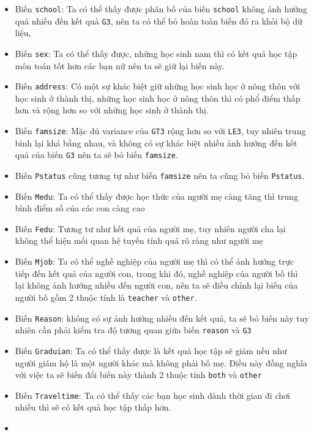     \begin{itemize}
\tightlist
\item
  Biến \texttt{school}: Ta có thể thấy được phân bố của biến
  \texttt{school} không ảnh hưởng quá nhiều đến kết quả \texttt{G3}, nên
  ta có thể bỏ hoàn toàn biến đó ra khỏi bộ dữ liệu,
\item
  Biến \texttt{sex}: Ta có thể thấy được, những học sinh nam thì có kết
  quả học tập môn toán tốt hơn các bạn nữ nên ta sẽ giữ lại biến này.
\item
  Biến \texttt{address}: Có một sự khác biệt giữ những học sinh học ở
  nông thôn với học sinh ở thành thị, những học sinh học ở nông thôn thì
  có phổ điểm thấp hơn và rộng hơn so với những học sinh ở thành thị.
\item
  Biến \texttt{famsize}: Mặc dú variance của \texttt{GT3} rộng hơn so
  với \texttt{LE3}, tuy nhiên trung bình lại khá bằng nhau, và không có
  sự khác biệt nhiều ảnh hưởng đến kết quả của biến \texttt{G3} nên ta
  sẽ bỏ biến \texttt{famsize}.
\item
  Biến \texttt{Pstatus} cũng tương tự như biến \texttt{famsize} nên ta
  cũng bỏ biến \texttt{Pstatus}.
\item
  Biến \texttt{Medu}: Ta có thể thấy được học thức của người mẹ càng tăng thì trung bình điểm số của các con càng cao
\item
  Biến \texttt{Fedu}: Tương tư như kết quả của người mẹ, tuy nhiên người cha lại không thể hiện mối quan hệ tuyến tính quá rõ ràng như người mẹ
\item
  Biến \texttt{Mjob}: Ta có thể nghề nghiệp của người mẹ thì có thể ảnh
  hưởng trực tiếp đến kết quả của người con, trong khi đó, nghề nghiệp
  của người bố thì lại không ảnh hưởng nhiều đến người con, nên ta sẽ
  điều chỉnh lại biến của người bố gồm 2 thuộc tính là \texttt{teacher}
  và \texttt{other}.
\item
  Biến \texttt{Reason}: không có sự ảnh hưởng nhiều đến kết quả, ta sẽ
  bỏ biến này tuy nhiên cần phải kiểm tra độ tương quan giữa biến
  \texttt{reason} và \texttt{G3}
\item
  Biến \texttt{Graduian}: Ta có thể thấy được là kết quả học tập sẽ giảm
  nếu như người giám hộ là một người khác mà không phải bố mẹ. Điều này
  đồng nghĩa với việc ta sẽ biến đổi biến này thành 2 thuộc tính
  \texttt{both} và \texttt{other}
\item
  Biến \texttt{Traveltime}: Ta có thể thấy các bạn học sinh dành thời
  gian đi chơi nhiều thì sẽ có kết quả học tập thấp hơn.
\item

\end{itemize}
